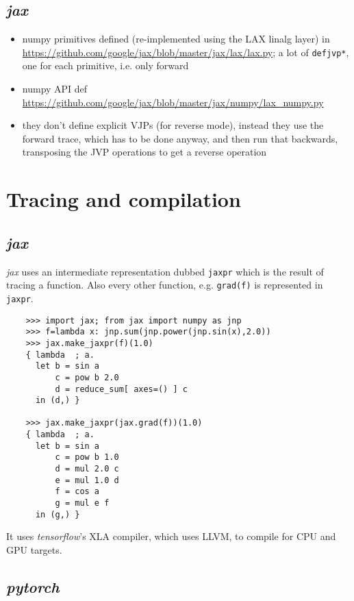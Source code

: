 \documentclass[parskip,paper=a4,11pt,headsepline]{scrartcl}
\newcommand{\soft}[1]{\textsl{#1}\xspace}
\newcommand{\pytorch}{\soft{pytorch}}
\newcommand{\jax}{\soft{jax}}
\newcommand{\tf}{\soft{tensorflow}}
\newcommand{\co}[1]{\texttt{#1}}
\begin{document}
\subsection{\jax}

\begin{itemize}
    \item numpy primitives defined (re-implemented using the LAX linalg layer) in
        \url{https://github.com/google/jax/blob/master/jax/lax/lax.py};
        a lot of \co{defjvp*}, one for each primitive, i.e. only forward
    \item numpy API def
        \url{https://github.com/google/jax/blob/master/jax/numpy/lax_numpy.py}
    \item they don't define explicit VJPs (for reverse mode), instead they use
        the forward trace, which has to be done anyway, and then run that
        backwards, transposing the JVP operations to get a reverse operation
\end{itemize}

\section{Tracing and compilation}

\subsection{\jax}

\jax uses an intermediate representation
dubbed \co{jaxpr} which is the result of tracing a function. Also every
other function, e.g. \co{grad(f)} is represented in \co{jaxpr}.

\begin{verbatim}
    >>> import jax; from jax import numpy as jnp
    >>> f=lambda x: jnp.sum(jnp.power(jnp.sin(x),2.0))
    >>> jax.make_jaxpr(f)(1.0)
    { lambda  ; a.
      let b = sin a
          c = pow b 2.0
          d = reduce_sum[ axes=() ] c
      in (d,) }

    >>> jax.make_jaxpr(jax.grad(f))(1.0)
    { lambda  ; a.
      let b = sin a
          c = pow b 1.0
          d = mul 2.0 c
          e = mul 1.0 d
          f = cos a
          g = mul e f
      in (g,) }
\end{verbatim}

It uses \tf's XLA compiler, which uses LLVM, to compile for CPU and GPU targets.

\subsection{\pytorch}
\end{document}
